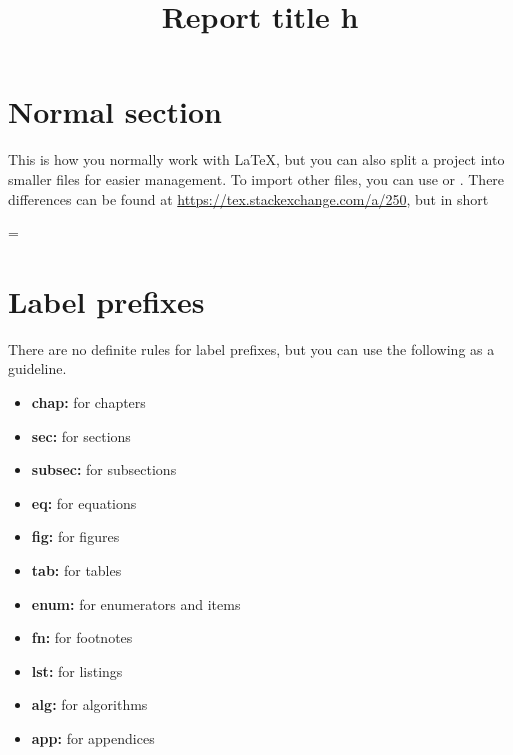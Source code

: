 \documentclass[twoside,final]{hcmut-report}
\title{Report title h}
\begin{document}
\coverpage%


\tableofcontents
\listoffigures
\listoftables
\lstlistoflistings{}

\clearpage
\section{Normal section}
This is how you normally work with \LaTeX, but you can also split a project into smaller files for easier management.
To import other files, you can use \texttt{} or \texttt{}.
There differences can be found at \url{https://tex.stackexchange.com/a/250}, but in short

\begin{center}
  \texttt{} = \texttt{\clearpage  \clearpage}
\end{center}

\section{Label prefixes}
There are no definite rules for label prefixes, but you can use the following as a guideline.
\begin{itemize}
  \item \textbf{chap:} for chapters
  \item \textbf{sec:} for sections
  \item \textbf{subsec:} for subsections
  \item \textbf{eq:} for equations
  \item \textbf{fig:} for figures
  \item \textbf{tab:} for tables
  \item \textbf{enum:} for enumerators and items
  \item \textbf{fn:} for footnotes
  \item \textbf{lst:} for listings
  \item \textbf{alg:} for algorithms
  \item \textbf{app:} for appendices
\end{itemize}
\end{document}
